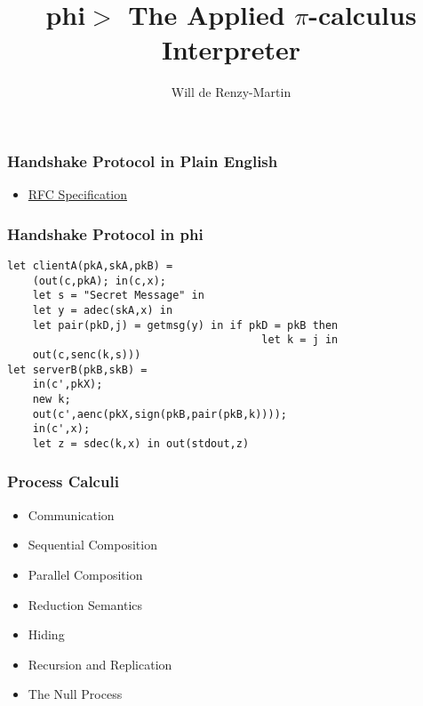 \documentclass[t]{beamer}
\author{Will de Renzy-Martin}
\title{phi$>$ The Applied $\pi$-calculus Interpreter}
\begin{document}
\frame{\maketitle}

\begin{frame}
\frametitle{Handshake Protocol in Plain English}
\begin{itemize}
    \item \href{http://tools.ietf.org/html/rfc5246\#section-7.4}{RFC Specification}
\end{itemize}
\end{frame}

\begin{frame}[fragile]
\frametitle{Handshake Protocol in phi}
\begin{verbatim}
let clientA(pkA,skA,pkB) =  
    (out(c,pkA); in(c,x); 
    let s = "Secret Message" in
    let y = adec(skA,x) in
    let pair(pkD,j) = getmsg(y) in if pkD = pkB then 
                                        let k = j in
    out(c,senc(k,s)))
let serverB(pkB,skB) = 
    in(c',pkX);
    new k;
    out(c',aenc(pkX,sign(pkB,pair(pkB,k))));
    in(c',x);
    let z = sdec(k,x) in out(stdout,z)
\end{verbatim}

\end{frame}

\begin{frame}
\frametitle{Process Calculi}
\begin{itemize}
        \pause
    \item Communication
        \pause
    \item Sequential Composition
        \pause
    \item Parallel Composition
        \pause
    \item Reduction Semantics
        \pause
    \item Hiding 
        \pause
    \item Recursion and Replication
        \pause
    \item The Null Process
\end{itemize}
\end{frame}
\end{document}
